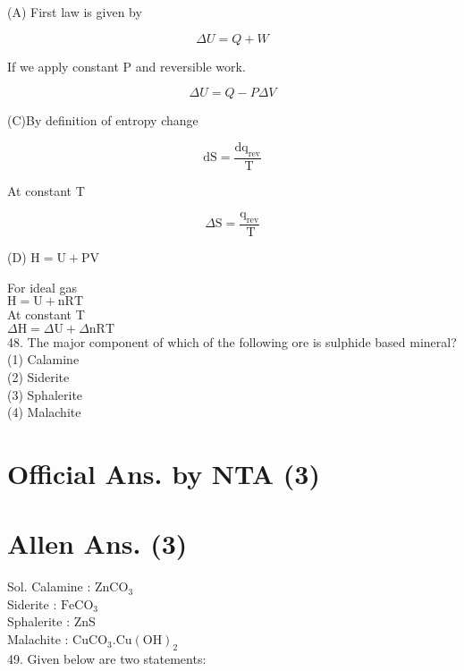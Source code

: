 \documentclass[10pt]{article}
\begin{document}
(A) First law is given by

\[
\Delta U=Q+W
\]

If we apply constant P and reversible work.

\[
\Delta U=Q-P \Delta V
\]

(C)By definition of entropy change

\[
\mathrm{dS}=\frac{\mathrm{dq}_{\mathrm{rev}}}{\mathrm{~T}}
\]

At constant T

\[
\Delta \mathrm{S}=\frac{\mathrm{q}_{\mathrm{rev}}}{\mathrm{~T}}
\]

(D) \(\mathrm{H}=\mathrm{U}+\mathrm{PV}\)

For ideal gas\\
\(\mathrm{H}=\mathrm{U}+\mathrm{nRT}\)\\
At constant T\\
\(\Delta \mathrm{H}=\Delta \mathrm{U}+\Delta \mathrm{nRT}\)\\
48. The major component of which of the following ore is sulphide based mineral?\\
(1) Calamine\\
(2) Siderite\\
(3) Sphalerite\\
(4) Malachite

\section*{Official Ans. by NTA (3)}
\section*{Allen Ans. (3)}
Sol. Calamine : \(\mathrm{ZnCO}_{3}\)\\
Siderite : \(\mathrm{FeCO}_{3}\)\\
Sphalerite : ZnS\\
Malachite : \(\mathrm{CuCO}_{3} . \mathrm{Cu}(\mathrm{OH})_{2}\)\\
49. Given below are two statements:
\end{document}
